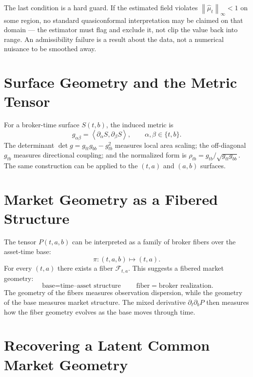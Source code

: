 \documentclass[11pt,a4paper]{article}
\numberwithin{equation}{section}
\newcommand{\norm}[1]{\left\lVert#1\right\rVert}
\newcommand{\inner}[2]{\left\langle#1,#2\right\rangle}
\begin{document}
The last condition is a hard guard. If the estimated field violates
$\norm{\hat\mu_t}_\infty<1$ on some region, no standard
quasiconformal interpretation may be claimed on that domain --- the
estimator must flag and exclude it, not clip the value back into
range. An admissibility failure is a result about the data, not a
numerical nuisance to be smoothed away.

\section{Surface Geometry and the Metric Tensor}

For a broker-time surface $S(t,b)$, the induced metric is
\begin{equation}
g_{\alpha\beta}=\inner{\partial_\alpha S}{\partial_\beta S},
\qquad\alpha,\beta\in\{t,b\}.
\end{equation}
The determinant $\det g=g_{tt}g_{bb}-g_{tb}^2$ measures local area
scaling; the off-diagonal $g_{tb}$ measures directional coupling;
and the normalized form is
$\rho_{tb}=g_{tb}/\sqrt{g_{tt}g_{bb}}$. The same construction can be
applied to the $(t,a)$ and $(a,b)$ surfaces.

\section{Market Geometry as a Fibered Structure}

The tensor $P(t,a,b)$ can be interpreted as a family of broker
fibers over the asset-time base:
\begin{equation}
\pi:(t,a,b)\mapsto(t,a).
\end{equation}
For every $(t,a)$ there exists a fiber $\mathcal{F}_{t,a}$. This
suggests a fibered market geometry:
\[
\boxed{\text{base}=\text{time--asset structure}}
\qquad
\boxed{\text{fiber}=\text{broker realization}.}
\]
The geometry of the fibers measures observation dispersion, while
the geometry of the base measures market structure. The mixed
derivative $\partial_t\partial_bP$ then measures how the fiber
geometry evolves as the base moves through time.

\section{Recovering a Latent Common Market Geometry}
\end{document}
